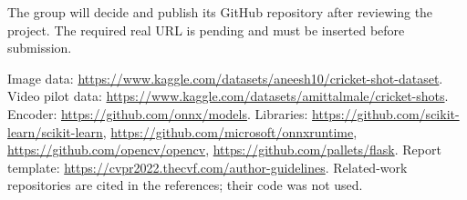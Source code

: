 The group will decide and publish its GitHub repository after reviewing the project. The required real URL is pending and must be inserted before submission.

Image data: \url{https://www.kaggle.com/datasets/aneesh10/cricket-shot-dataset}. Video pilot data: \url{https://www.kaggle.com/datasets/amittalmale/cricket-shots}. Encoder: \url{https://github.com/onnx/models}. Libraries: \url{https://github.com/scikit-learn/scikit-learn}, \url{https://github.com/microsoft/onnxruntime}, \url{https://github.com/opencv/opencv}, \url{https://github.com/pallets/flask}. Report template: \url{https://cvpr2022.thecvf.com/author-guidelines}. Related-work repositories are cited in the references; their code was not used.
